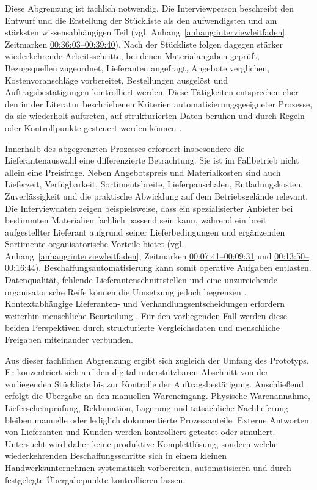 \documentclass[a4paper,12pt]{article}
\begin{document}
Diese Abgrenzung ist fachlich notwendig. Die Interviewperson beschreibt den Entwurf und die Erstellung der Stückliste als den aufwendigsten und am stärksten wissensabhängigen Teil (vgl. Anhang~\ref{anhang:interviewleitfaden}, Zeitmarken \hyperlink{itv:aufwand-stueckliste}{00:36:03--00:39:40}). Nach der Stückliste folgen dagegen stärker wiederkehrende Arbeitsschritte, bei denen Materialangaben geprüft, Bezugsquellen zugeordnet, Lieferanten angefragt, Angebote verglichen, Kostenvoranschläge vorbereitet, Bestellungen ausgelöst und Auftragsbestätigungen kontrolliert werden. Diese Tätigkeiten entsprechen eher den in der Literatur beschriebenen Kriterien automatisierungsgeeigneter Prozesse, da sie wiederholt auftreten, auf strukturierten Daten beruhen und durch Regeln oder Kontrollpunkte gesteuert werden können \parencite{choi_candidate_2021,moreira_business_2024,wellmann_framework_2020}.

Innerhalb des abgegrenzten Prozesses erfordert insbesondere die Lieferantenauswahl eine differenzierte Betrachtung. Sie ist im Fallbetrieb nicht allein eine Preisfrage. Neben Angebotspreis und Materialkosten sind auch Lieferzeit, Verfügbarkeit, Sortimentsbreite, Lieferpauschalen, Entladungskosten, Zuverlässigkeit und die praktische Abwicklung auf dem Betriebsgelände relevant. Die Interviewdaten zeigen beispielsweise, dass ein spezialisierter Anbieter bei bestimmten Materialien fachlich passend sein kann, während ein breit aufgestellter Lieferant aufgrund seiner Lieferbedingungen und ergänzenden Sortimente organisatorische Vorteile bietet (vgl. Anhang~\ref{anhang:interviewleitfaden}, Zeitmarken \hyperlink{itv:lieferbedingungen-sortiment}{00:07:41--00:09:31} und \hyperlink{itv:lieferantenspezialisierung}{00:13:50--00:16:44}). Beschaffungsautomatisierung kann somit operative Aufgaben entlasten. Datenqualität, fehlende Lieferantenschnittstellen und eine unzureichende organisatorische Reife können die Umsetzung jedoch begrenzen \parencite{flechsig_robotic_2022}. Kontextabhängige Lieferanten- und Verhandlungsentscheidungen erfordern weiterhin menschliche Beurteilung \parencite{santos_rebooting_2025}. Für den vorliegenden Fall werden diese beiden Perspektiven durch strukturierte Vergleichsdaten und menschliche Freigaben miteinander verbunden.

Aus dieser fachlichen Abgrenzung ergibt sich zugleich der Umfang des Prototyps. Er konzentriert sich auf den digital unterstützbaren Abschnitt von der vorliegenden Stückliste bis zur Kontrolle der Auftragsbestätigung. Anschließend erfolgt die Übergabe an den manuellen Wareneingang. Physische Warenannahme, Lieferscheinprüfung, Reklamation, Lagerung und tatsächliche Nachlieferung bleiben manuelle oder lediglich dokumentierte Prozessanteile. Externe Antworten von Lieferanten und Kunden werden kontrolliert getestet oder simuliert. Untersucht wird daher keine produktive Komplettlösung, sondern welche wiederkehrenden Beschaffungsschritte sich in einem kleinen Handwerksunternehmen systematisch vorbereiten, automatisieren und durch festgelegte Übergabepunkte kontrollieren lassen.
\end{document}
